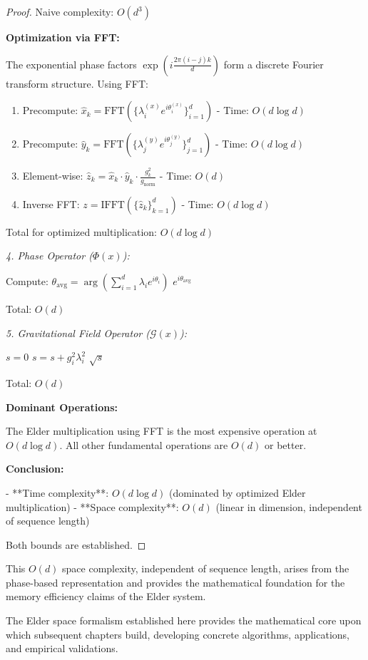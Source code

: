\begin{proof}
Naive complexity: $O(d^3)$

\textbf{Optimization via FFT:}

The exponential phase factors $\exp(i\frac{2\pi(i-j)k}{d})$ form a discrete Fourier transform structure. Using FFT:

\begin{enumerate}
\item Precompute: $\hat{x}_k = \text{FFT}(\{\lambda_i^{(x)} e^{i\theta_i^{(x)}}\}_{i=1}^d)$ - Time: $O(d \log d)$
\item Precompute: $\hat{y}_k = \text{FFT}(\{\lambda_j^{(y)} e^{i\theta_j^{(y)}}\}_{j=1}^d)$ - Time: $O(d \log d)$
\item Element-wise: $\hat{z}_k = \hat{x}_k \cdot \hat{y}_k \cdot \frac{g_k^2}{g_{\text{norm}}}$ - Time: $O(d)$
\item Inverse FFT: $z = \text{IFFT}(\{\hat{z}_k\}_{k=1}^d)$ - Time: $O(d \log d)$
\end{enumerate}

Total for optimized multiplication: $O(d \log d)$

\textit{4. Phase Operator ($\Phi(x)$):}
\begin{algorithmic}[1]
    \State Compute: $\theta_{\text{avg}} = \arg\left(\sum_{i=1}^d \lambda_i e^{i\theta_i}\right)$
    \State \Return $e^{i\theta_{\text{avg}}}$
\EndProcedure
\end{algorithmic}

Total: $O(d)$

\textit{5. Gravitational Field Operator ($\mathcal{G}(x)$):}
\begin{algorithmic}[1]
    \State $s = 0$
        \State $s = s + g_i^2 \lambda_i^2$
    \EndFor
    \State \Return $\sqrt{s}$
\EndProcedure
\end{algorithmic}

Total: $O(d)$

\textbf{Dominant Operations:}

The Elder multiplication using FFT is the most expensive operation at $O(d \log d)$. All other fundamental operations are $O(d)$ or better.

\textbf{Conclusion:}

- **Time complexity**: $O(d \log d)$ (dominated by optimized Elder multiplication)
- **Space complexity**: $O(d)$ (linear in dimension, independent of sequence length)

Both bounds are established.
\end{proof}

This $O(d)$ space complexity, independent of sequence length, arises from the phase-based representation and provides the mathematical foundation for the memory efficiency claims of the Elder system.

The Elder space formalism established here provides the mathematical core upon which subsequent chapters build, developing concrete algorithms, applications, and empirical validations.